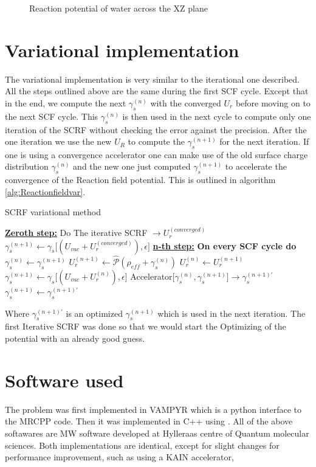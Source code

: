 \documentclass[../master_thesis.tex]{subfiles}
\begin{document}
\begin{figure}[h!]
\begin{subfigure}[b]{\linewidth}
  \end{subfigure}
  \caption{Reaction potential of water across the XZ plane}
  \label{fig:watpots}
\end{figure}

\section{Variational implementation}
The variational implementation is very similar to the iterational one described.
All the steps outlined above are the same during the first \ac{SCF} cycle. Except
that in the end, we compute the next $\gamma_s^{(n)}$ with the converged $U_r$ before
moving on to the next \ac{SCF} cycle. This $\gamma_s^{(n)}$ is then used in the next cycle
to compute only one iteration of the \ac{SCRF} without checking the error against the
precision. After the one iteration we use the new $U_R$ to compute the $\gamma_s^{(n+1)}$
for the next iteration. If one is using a convergence accelerator one can make
use of the old surface charge distribution $\gamma_s^{(n)}$ and the new one just computed
$\gamma_s^{(n+1)}$ to accelerate the convergence of the Reaction field potential.
This is outlined in algorithm \ref{alg:Reactionfieldvar}.
\begin{algorithm}
  \caption{\ac{SCRF} variational method}\label{alg:Reactionfieldvar}
  \begin{algorithmic}
    \STATE \underline{\textbf{Zeroth step:}}
    \STATE Do The iterative \ac{SCRF} $\rightarrow U_r^{(converged)}$
    \STATE $\gamma_s^{(n+1)} \leftarrow \gamma_s\big[(U_{vac}+ U_r^{(converged)}), \epsilon\big]$
    \STATE \underline{\textbf{n-th step:}}
    \STATE \textbf{On every SCF cycle do}
    \STATE $\gamma_s^{(n)} \leftarrow \gamma_s^{(n+1)}$
    \STATE $U_r^{(n+1)} \leftarrow \hat{\mathscr{P}} (\rho_{eff} + \gamma_s^{(n)})$
    \STATE $U_r^{(n)} \leftarrow U_r^{(n+1)}$
    \STATE $\gamma_s^{(n+1)} \leftarrow \gamma_s\big[(U_{vac}+ U_r^{(n)}), \epsilon\big]$
    \STATE Accelerator[$\gamma_s^{(n)}, \gamma_s^{(n+1)}] \rightarrow \gamma_s^{(n+1)\prime}$
    \STATE $\gamma_s^{(n+1)} \leftarrow\gamma_s^{(n+1)\prime}$
  \end{algorithmic}
\end{algorithm}
Where $\gamma_s^{(n+1)\prime}$ is an optimized $\gamma_s^{(n+1)}$ which is used
in the next iteration. The first Iterative \ac{SCRF} was done so that we would
start the Optimizing of the potential with an already good guess.
\section{Software used}
The problem was first implemented in VAMPYR \cite{Vampyr} which is a python interface to the
MRCPP \cite{MRCPP} code.  Then it was implemented in C++ using \mrchem \cite{MRchem}. All of the above softawares
are \ac{MW} software developed at Hylleraas centre of Quantum molecular sciences.
Both implementations are identical, except for slight changes for
performance improvement, such as using a KAIN accelerator,


\biblio
\end{document}
